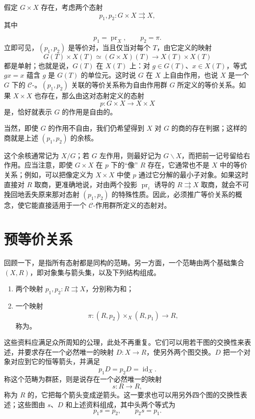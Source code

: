 假定 $G\times X$ 存在，考虑两个态射
\[
 p_1,p_2:G\times X\rightrightarrows X,
\]
其中

\[
 p_1=\operatorname{pr}_X,\qquad p_2=\pi.
\]
立即可见，$(p_1,p_2)$ 是等价对，当且仅当对每个 $T$，由它定义的映射
\[
 G(T)\times X(T)\simeq(G\times X)(T)
 \longrightarrow X(T)\times X(T)
\]
都是单射；也就是说，$G(T)$ 在 $X(T)$ 上：对 $g\in G(T)$、$x\in X(T)$，等式 $gx=x$ 蕴含 $g$ 是 $G(T)$ 的单位元。这时说 $G$ 在 $X$ 上自由作用，也说 $X$ 是一个 $G$ 下的 $\mathcal C$-。$(p_1,p_2)$ 关联的等价关系称为自由作用群 $G$ 所定义的等价关系。如果 $X\times X$ 也存在，那么由这对态射定义的态射
\[
 p:G\times X\longrightarrow X\times X
\]
是，恰好就表示 $G$ 的作用是自由的。

当然，即使 $G$ 的作用不自由，我们仍希望得到 $X$ 对 $G$ 的商的存在判据；这样的商就是上述 $(p_1,p_2)$ 的余核。

这个余核通常记为 $X/G$；若 $G$ 左作用，则最好记为 $G\backslash X$，而把前一记号留给右作用。应当注意，即使 $G\times X$ 在 $p$ 下的“像” $R$ 存在，它通常也不是 $X$ 中的等价关系；例如，可以把像定义为 $X\times X$ 中使 $p$ 通过它分解的最小子对象。如果这时直接对 $R$ 取商，更准确地说，对由两个投影 $\operatorname{pr}_i$ 诱导的 $R\rightrightarrows X$ 取商，就会不可挽回地丢失原来那对态射 $(p_1,p_2)$ 的特殊性质。因此，必须推广等价关系的概念，使它能直接适用于一个 $\mathcal C$-作用群所定义的态射对。

\section{预等价关系}
回顾一下，是指所有态射都是同构的范畴。另一方面，一个范畴由两个基础集合 $(X,R)$，即对象集与箭头集，以及下列结构组成。

\begin{enumerate}[label=(\roman*)]
 \item 两个映射 $p_1,p_2:R\rightrightarrows X$，分别称为和；
 \item 一个映射
 \[
  \pi:(R,p_2)\times_X(R,p_1)\longrightarrow R,
 \]
 称为。
\end{enumerate}
这些资料应满足众所周知的公理，此处不再重复。它们可以用若干图的交换性来表述，并要求存在一个必然唯一的映射 $D:X\to R$，使另外两个图交换。$D$ 把一个对象对应到它的恒等箭头，并满足
\[
 p_1D=p_2D=\operatorname{id}_X.
\]
称这个范畴为群胚，则是说存在一个必然唯一的映射
\[
 s:R\longrightarrow R,
\]
称为 $R$ 的，它把每个箭头变成逆箭头。这一要求也可以用另外四个图的交换性表述；这些图由 $s$、$D$ 和上述资料组成，其中头两个等式为
\[
 p_1s=p_2,\qquad p_2s=p_1.
\]

